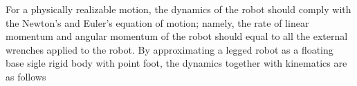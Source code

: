 For a physically realizable motion, the dynamics of the robot should comply with the Newton's and Euler's equation of motion; namely, the rate of linear momentum and angular momentum of the robot should equal to all the external wrenches applied to the robot. By approximating a legged robot as a floating base sigle rigid body with point foot, the dynamics together with kinematics are as follows
